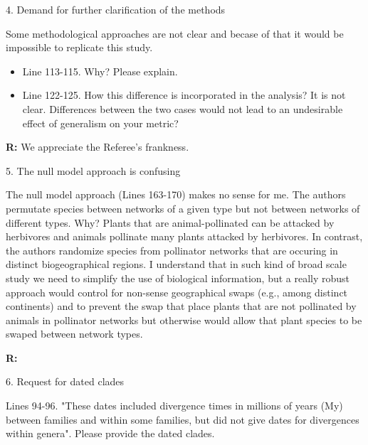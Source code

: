 \documentclass[12pt]{letter}
\newenvironment{refquote}{\bigskip \begin{it}}{\end{it}\smallskip}
\begin{document}
 4. Demand for further clarification of the methods

    \begin{refquote}

      Some methodological approaches are not clear and becase of that it would be impossible to replicate this study.

        \begin{itemize}
          \item Line 113-115. Why? Please explain.
          \item Line 122-125. How this difference is incorporated in the analysis? It is not clear. Differences between the two cases would not lead to an undesirable effect of generalism on your metric?
        \end{itemize}

      \end{refquote}

      \textbf{R:} We appreciate the Referee's frankness.


  5. The null model approach is confusing

    \begin{refquote} 

      The null model approach (Lines 163-170) makes no sense for me. The authors permutate species between networks of a given type but not between networks of different types. Why? Plants that are animal-pollinated can be attacked by herbivores and animals pollinate many plants attacked by herbivores. In contrast, the authors randomize species from pollinator networks that are occuring in distinct biogeographical regions. I understand that in such kind of broad scale study we need to simplify the use of biological information, but a really robust approach would control for non-sense geographical swaps (e.g., among distinct continents) and to prevent the swap that place plants that are not pollinated by animals in pollinator networks but otherwise would allow that plant species to be swaped between network types.

      \end{refquote}

      \textbf{R:}


  6. Request for dated clades

    \begin{refquote}

      Lines 94-96. "These dates included divergence times in millions of years (My) between families and within some families, but did not give dates for divergences within genera". Please provide the dated clades.

      \end{refquote}
\end{document}
